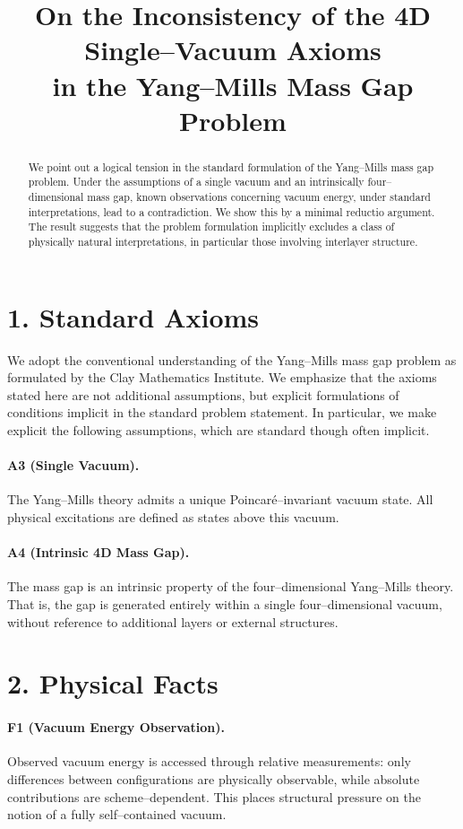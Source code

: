 \documentclass[11pt]{article}
\title{On the Inconsistency of the 4D Single--Vacuum Axioms\\
in the Yang--Mills Mass Gap Problem}
\author{}
\date{}
\begin{document}
\maketitle

\begin{abstract}
We point out a logical tension in the standard formulation of the Yang--Mills mass gap problem.
Under the assumptions of a single vacuum and an intrinsically four--dimensional mass gap,
known observations concerning vacuum energy, under standard interpretations,
lead to a contradiction.
We show this by a minimal reductio argument.
The result suggests that the problem formulation implicitly excludes a class of physically natural interpretations,
in particular those involving interlayer structure.
\end{abstract}

\section*{1. Standard Axioms}

We adopt the conventional understanding of the Yang--Mills mass gap problem as formulated by the Clay Mathematics Institute.
We emphasize that the axioms stated here are not additional assumptions,
but explicit formulations of conditions implicit in the standard problem statement.
In particular, we make explicit the following assumptions, which are standard though often implicit.

\paragraph{A3 (Single Vacuum).}
The Yang--Mills theory admits a unique Poincar\'e--invariant vacuum state.
All physical excitations are defined as states above this vacuum.

\paragraph{A4 (Intrinsic 4D Mass Gap).}
The mass gap is an intrinsic property of the four--dimensional Yang--Mills theory.
That is, the gap is generated entirely within a single four--dimensional vacuum,
without reference to additional layers or external structures.

\section*{2. Physical Facts}

\paragraph{F1 (Vacuum Energy Observation).}
Observed vacuum energy is accessed through relative measurements:
only differences between configurations are physically observable,
while absolute contributions are scheme--dependent.
This places structural pressure on the notion of a fully self--contained vacuum.
\end{document}
